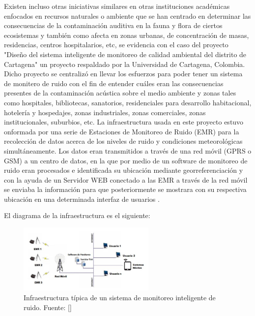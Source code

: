 {Existen incluso otras iniciativas similares en otras instituciones académicas enfocados en recursos naturales o ambiente que se han centrado en determinar las consecuencias de la contaminación auditiva en la fauna y flora de ciertos ecosistemas y también como afecta en zonas urbanas, de concentración de masas, residencias, centros hospitalarios, etc, se evidencia con el caso del proyecto "Diseño del sistema inteligente de monitoreo de calidad ambiental del distrito de Cartagena" un proyecto respaldado por la Universidad de Cartagena, Colombia. Dicho proyecto se centralizó en llevar los esfuerzos para poder tener un sistema de monitero de ruido con el fin de entender cuáles eran las consecuencias presentes de la contaminación acústica sobre el medio ambiente y zonas tales como hospitales, bibliotecas, sanatorios, residenciales para desarrollo habitacional, hotelería y hospedajes, zonas industriales, zonas comerciales, zonas institucionales, suburbios, etc. La infraestructura usada en este proyecto estuvo onformada por
una serie de Estaciones de Monitoreo de Ruido (EMR) para la recolección de datos acerca de los niveles de ruido y condiciones meteorológicas simultáneamente. Los datos eran transmitidos a través de una red móvil (GPRS o GSM) a un centro de datos, en la que por medio de un software de monitoreo de ruido eran procesados e
identificada su ubicación mediante georreferenciación y con la ayuda de un Servidor WEB conectado a las EMR a través de la red móvil se enviaba la información para que posteriormente se mostrara con su respectiva ubicación en una determinada interfaz de usuarios \parencite{epacartagena2015}.

El diagrama de la infraestructura es el siguiente:

\begin{figure}[H] 
    \centering
    \includegraphics[width=0.6\textwidth]{img/SMI_cartagena.png}
    \caption{Infraestructura típica de un sistema de monitoreo inteligente de ruido. Fuente: [\cite{epacartagena2015}]}
    \label{fig:diagrama-sistema-cartagena}
\end{figure}

}


